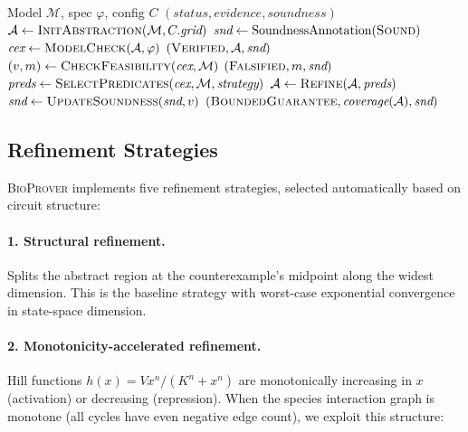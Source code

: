 \documentclass[11pt]{article}
\newcommand{\bioprover}{\textsc{BioProver}}
\newcommand{\cegar}{\textsc{CEGAR}}
\begin{document}
\begin{algorithm}[t]
\caption{\bioprover{} \cegar{} loop}
\label{alg:cegar}
\begin{algorithmic}[1]
\Require Model $\mathcal{M}$, spec $\varphi$, config $C$
\Ensure $(\textit{status}, \textit{evidence}, \textit{soundness})$
\State $\mathcal{A} \gets \textsc{InitAbstraction}(\mathcal{M}, C.\textit{grid})$
\State $\textit{snd} \gets \text{SoundnessAnnotation}(\textsc{Sound})$
  \State $\textit{cex} \gets \textsc{ModelCheck}(\mathcal{A}, \varphi)$
   \Return $(\textsc{Verified}, \mathcal{A}, \textit{snd})$
  \EndIf
  \State $(v, m) \gets \textsc{CheckFeasibility}(\textit{cex}, \mathcal{M})$
   \Return $(\textsc{Falsified}, m, \textit{snd})$
  \EndIf
  \State $\textit{preds} \gets \textsc{SelectPredicates}(\textit{cex}, \mathcal{M}, \textit{strategy})$
  \State $\mathcal{A} \gets \textsc{Refine}(\mathcal{A}, \textit{preds})$
  \State $\textit{snd} \gets \textsc{UpdateSoundness}(\textit{snd}, v)$
\EndFor
\State \Return $(\textsc{BoundedGuarantee}, \textit{coverage}(\mathcal{A}), \textit{snd})$
\end{algorithmic}
\end{algorithm}

\subsection{Refinement Strategies}
\label{sec:refinement}

\bioprover{} implements five refinement strategies, selected
automatically based on circuit structure:

\paragraph{1. Structural refinement.}
Splits the abstract region at the counterexample's midpoint along the
widest dimension. This is the baseline strategy with worst-case
exponential convergence in state-space dimension.

\paragraph{2. Monotonicity-accelerated refinement.}
Hill functions $h(x) = V x^n/(K^n + x^n)$ are monotonically
increasing in $x$ (activation) or decreasing (repression). When the
species interaction graph is monotone (all cycles have even negative
edge count), we exploit this structure:
\end{document}
